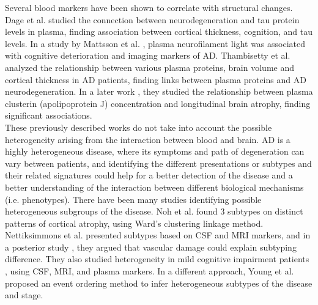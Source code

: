 
Several blood markers have been shown to correlate with structural changes. Dage et al. \cite{Dage2016} studied the connection between neurodegeneration and tau protein levels in plasma, finding association between cortical thickness, cognition, and tau levels. In a study by Mattsson et al. \cite{Mattsson2017}, plasma neurofilament light was associated with cognitive deterioration and imaging markers of AD. Thambisetty et al. \cite{Thambisetty2011} analyzed the relationship between various plasma proteins, brain volume and cortical thickness in AD patients, finding links between plasma proteins and AD neurodegeneration. In a later work \cite{Thambisetty2012}, they studied the relationship between plasma clusterin (apolipoprotein J) concentration and longitudinal brain atrophy, finding significant associations. \\

These previously described works do not take into account the possible heterogeneity arising from the interaction between blood and brain. AD is a highly heterogeneous disease, where its symptoms and path of degeneration can vary between patients, and identifying the different presentations or subtypes and their related signatures could help for a better detection of the disease and a better understanding of the interaction between different biological mechanisms (i.e. phenotypes). There have been many studies identifying possible heterogeneous subgroups of the disease. Noh et al. \cite{Noh2014} found 3 subtypes on distinct patterns of cortical atrophy, using Ward's clustering linkage method. Nettiksimmons et al. \cite{Nettiksimmons2010} presented subtypes based on CSF and MRI markers, and in a posterior study \cite{Nettiksimmons2013}, they argued that vascular damage could explain subtyping difference. They also studied heterogeneity in mild cognitive impairment patients \cite{Nettiksimmons2014}, using CSF, MRI, and plasma markers. In a different approach, Young et al. \cite{Young2015a,Young2017} proposed an event ordering method to infer heterogeneous subtypes of the disease and stage.  \\


